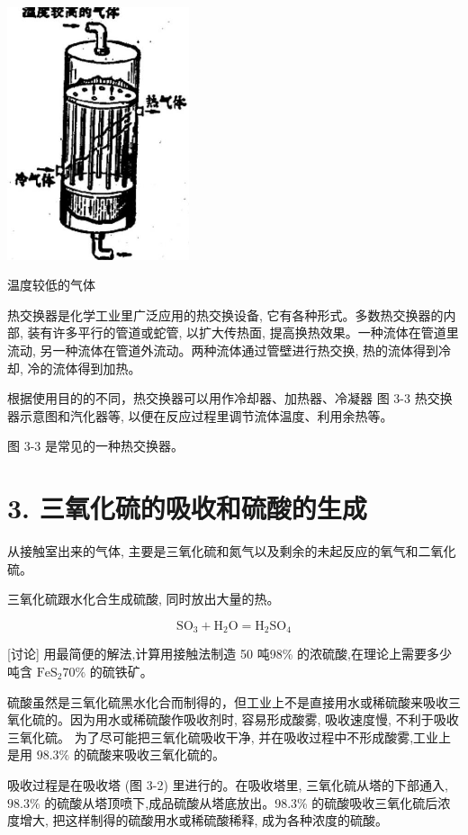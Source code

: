 \documentclass[10pt]{article}
\begin{document}
\begin{center}
\includegraphics[max width=0.4\textwidth]{images/01912d0f-097c-7e75-8f32-4f326cd86c9f_67_562896.jpg}
\end{center}

温度较低的气体

热交换器是化学工业里广泛应用的热交换设备, 它有各种形式。多数热交换器的内部, 装有许多平行的管道或蛇管, 以扩大传热面, 提高换热效果。一种流体在管道里流动, 另一种流体在管道外流动。两种流体通过管壁进行热交换, 热的流体得到冷却, 冷的流体得到加热。

根据使用目的的不同，热交换器可以用作冷却器、加热器、冷凝器 图 3-3 热交换器示意图和汽化器等, 以便在反应过程里调节流体温度、利用余热等。

图 3-3 是常见的一种热交换器。

\section*{3. 三氧化硫的吸收和硫酸的生成}

从接触室出来的气体, 主要是三氧化硫和氮气以及剩余的未起反应的氧气和二氧化硫。

三氧化硫跟水化合生成硫酸, 同时放出大量的热。

\[
{\mathrm{{SO}}}_{3} + {\mathrm{H}}_{2}\mathrm{O} = {\mathrm{H}}_{2}{\mathrm{{SO}}}_{4}
\]

[讨论] 用最简便的解法,计算用接触法制造 50 吨98\% 的浓硫酸,在理论上需要多少吨含 \({\mathrm{{FeS}}}_{2}{70}\%\) 的硫铁矿。

硫酸虽然是三氧化硫黑水化合而制得的，但工业上不是直接用水或稀硫酸来吸收三氧化硫的。因为用水或稀硫酸作吸收剂时, 容易形成酸雾, 吸收速度慢, 不利于吸收三氧化硫。 为了尽可能把三氧化硫吸收干净, 并在吸收过程中不形成酸雾,工业上是用 \({98.3}\%\) 的硫酸来吸收三氧化硫的。

吸收过程是在吸收塔 (图 3-2) 里进行的。在吸收塔里, 三氧化硫从塔的下部通入, \({98.3}\%\) 的硫酸从塔顶喷下,成品硫酸从塔底放出。98.3\% 的硫酸吸收三氧化硫后浓度增大, 把这样制得的硫酸用水或稀硫酸稀释, 成为各种浓度的硫酸。
\end{document}
